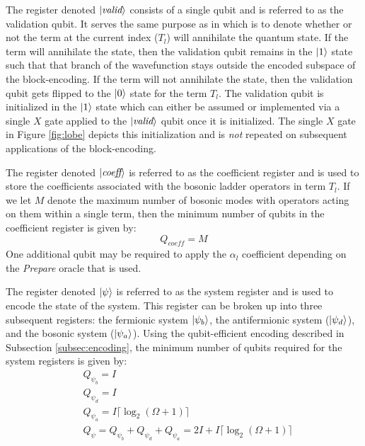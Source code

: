 The register denoted $\ket{\textit{valid}}$ consists of a single qubit and is referred to as the validation qubit.
It serves the same purpose as in \cite{liu2024efficient} which is to denote whether or not the term at the current index ($T_l$) will annihilate the quantum state.
If the term will annihilate the state, then the validation qubit remains in the $\ket{1}$ state such that that branch of the wavefunction stays outside the encoded subspace of the block-encoding.
If the term will not annihilate the state, then the validation qubit gets flipped to the $\ket{0}$ state for the term $T_l$.
The validation qubit is initialized in the $\ket{1}$ state which can either be assumed or implemented via a single $X$ gate applied to the $\ket{\textit{valid}}$ qubit once it is initialized.
The single $X$ gate in Figure \ref{fig:lobe} depicts this initialization and is \textit{not} repeated on subsequent applications of the block-encoding.

The register denoted $\ket{\textit{coeff}}$ is referred to as the coefficient register and is used to store the coefficients associated with the bosonic ladder operators in term $T_l$. 
If we let $M$ denote the maximum number of bosonic modes with operators acting on them within a single term, then the minimum number of qubits in the coefficient register is given by:
\begin{equation}
    Q_{\textit{coeff}} = M 
\end{equation} 
One additional qubit may be required to apply the $\alpha_l$ coefficient depending on the \textit{Prepare} oracle that is used.

The register denoted $\ket{\psi}$ is referred to as the system register and is used to encode the state of the system.
This register can be broken up into three subsequent registers: the fermionic system $\ket{\psi_b}$, the antifermionic system ($\ket{\psi_d}$), and the bosonic system ($\ket{\psi_a}$).
Using the qubit-efficient encoding described in Subsection \ref{subsec:encoding}, the minimum number of qubits required for the system registers is given by:
\begin{equation}
    \begin{split}
        &Q_{\psi_b} = I \\
        &Q_{\psi_d} = I \\
        &Q_{\psi_a} = I \lceil \log_2{(\Omega + 1)} \rceil \\
        &Q_{\psi} = Q_{\psi_b} + Q_{\psi_d} + Q_{\psi_a} = 2I + I\lceil \log_2{(\Omega + 1)} \rceil
    \end{split}
\end{equation} 

